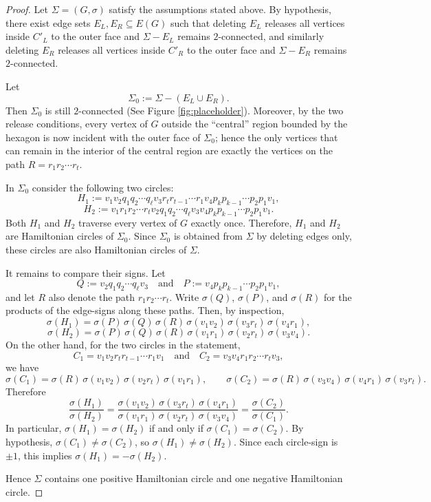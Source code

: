 \documentclass[12pt]{amsart}
\theoremstyle{theorem}%
\theoremstyle{definition}%
\begin{document}
\begin{proof}
Let $\Sigma=(G,\sigma)$ satisfy the assumptions stated above.  By hypothesis, there exist edge sets
$E_L,E_R\subseteq E(G)$ such that deleting $E_L$ releases all vertices  inside $C'_L$ to the outer face
and $\Sigma-E_L$ remains $2$-connected, and similarly deleting $E_R$ releases all vertices  inside $C'_R$
to the outer face and $\Sigma-E_R$ remains $2$-connected.

Let
\[
\Sigma_0 := \Sigma-(E_L\cup E_R).
\]
Then $\Sigma_0$ is still $2$-connected (See Figure \ref{fig:placeholder}).  Moreover, by the two release conditions, every vertex of $G$ outside the
``central'' region bounded by the hexagon is now incident with the outer face of $\Sigma_0$; hence the only vertices
that can remain in the interior of the central region are exactly the vertices on the path
$R=r_1r_2\cdots r_t$.

In $\Sigma_0$ consider the following two circles:
\[
H_1 := v_1v_2q_1q_2\cdots q_\ell v_3r_t r_{t-1}\cdots r_1v_4p_kp_{k-1}\cdots p_2p_1v_1,
\]
\[
H_2 := v_1r_1r_2\cdots r_tv_2q_1q_2\cdots q_\ell v_3v_4p_kp_{k-1}\cdots p_2p_1v_1.
\]
Both $H_1$ and $H_2$ traverse every vertex of $G$ exactly once.  Therefore, $H_1$ and $H_2$ are Hamiltonian circles of $\Sigma_0$.
Since $\Sigma_0$ is obtained from $\Sigma$ by deleting edges only, these circles are also Hamiltonian circles of $\Sigma$.

It remains to compare their signs.  Let
\[
Q := v_2q_1q_2\cdots q_\ell v_3
\quad\text{and}\quad
P := v_4p_kp_{k-1}\cdots p_2p_1v_1,
\]
and let $R$ also denote the path $r_1r_2\cdots r_t$.
Write $\sigma(Q)$, $\sigma(P)$, and $\sigma(R)$ for the products of the edge-signs along these paths.
Then, by inspection,
\[
\sigma(H_1)=\sigma(P)\,\sigma(Q)\,\sigma(R)\,\sigma(v_1v_2)\,\sigma(v_3r_t)\,\sigma(v_4r_1),
\]
\[
\sigma(H_2)=\sigma(P)\,\sigma(Q)\,\sigma(R)\,\sigma(v_1r_1)\,\sigma(v_2r_t)\,\sigma(v_3v_4).
\]
On the other hand, for the two circles in the statement,
\[
C_1=v_1v_2r_tr_{t-1}\cdots r_1v_1
\quad\text{and}\quad
C_2=v_3v_4r_1r_2\cdots r_tv_3,
\]
we have
\[
\sigma(C_1)=\sigma(R)\,\sigma(v_1v_2)\,\sigma(v_2r_t)\,\sigma(v_1r_1),
\qquad
\sigma(C_2)=\sigma(R)\,\sigma(v_3v_4)\,\sigma(v_4r_1)\,\sigma(v_3r_t).
\]
Therefore
\[
\frac{\sigma(H_1)}{\sigma(H_2)}
=
\frac{\sigma(v_1v_2)\,\sigma(v_3r_t)\,\sigma(v_4r_1)}
     {\sigma(v_1r_1)\,\sigma(v_2r_t)\,\sigma(v_3v_4)}
=
\frac{\sigma(C_2)}{\sigma(C_1)}.
\]
In particular, $\sigma(H_1)=\sigma(H_2)$ if and only if $\sigma(C_1)=\sigma(C_2)$.
By hypothesis, $\sigma(C_1)\neq\sigma(C_2)$, so $\sigma(H_1)\neq\sigma(H_2)$.
Since each circle-sign is $\pm 1$, this implies $\sigma(H_1)=-\sigma(H_2)$.

Hence $\Sigma$ contains one positive Hamiltonian circle and one negative Hamiltonian circle.
\end{proof}
\end{document}
